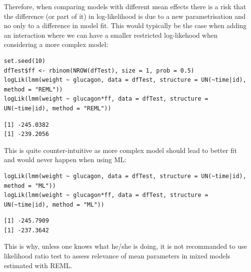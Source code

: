 \documentclass[12pt]{article}
\begin{document}
Therefore, when comparing models with different mean effects there is
a risk that the difference (or part of it) in log-likelihood is due to
a new parametrisation and no only to a difference in model fit. This
would typically be the case when adding an interaction where we can
have a smaller restricted log-likehood when considering a more complex
model:

\lstset{language=r,label= ,caption= ,captionpos=b,numbers=none}
\begin{lstlisting}
set.seed(10)
dfTest$ff <- rbinom(NROW(dfTest), size = 1, prob = 0.5)
logLik(lmm(weight ~ glucagon, data = dfTest, structure = UN(~time|id), method = "REML"))
logLik(lmm(weight ~ glucagon*ff, data = dfTest, structure = UN(~time|id), method = "REML"))
\end{lstlisting}

\begin{verbatim}
[1] -245.0382
[1] -239.2056
\end{verbatim}


This is quite counter-intuitive as more complex model should lead to
better fit and would never happen when using ML:
\lstset{language=r,label= ,caption= ,captionpos=b,numbers=none}
\begin{lstlisting}
logLik(lmm(weight ~ glucagon, data = dfTest, structure = UN(~time|id), method = "ML"))
logLik(lmm(weight ~ glucagon*ff, data = dfTest, structure = UN(~time|id), method = "ML"))
\end{lstlisting}

\begin{verbatim}
[1] -245.7909
[1] -237.3642
\end{verbatim}


This is why, unless one knows what he/she is doing, it is not
recommanded to use likelihood ratio test to assess relevance of mean
parameters in mixed models estimated with REML.
\end{document}
